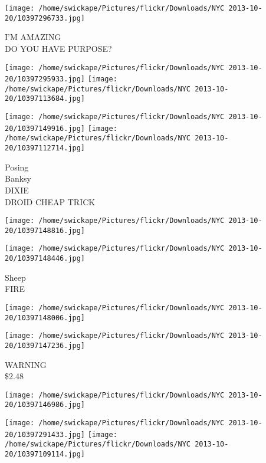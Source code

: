 \documentclass[10pt,letterpaper]{article}
\begin{document}
\vspace{0.25in}
\texttt{[image: /home/swickape/Pictures/flickr/Downloads/NYC 2013-10-20/10397296733.jpg]}

I'M AMAZING\\
DO YOU HAVE PURPOSE?\\
\pagebreak

\texttt{[image: /home/swickape/Pictures/flickr/Downloads/NYC 2013-10-20/10397295933.jpg]}
\texttt{[image: /home/swickape/Pictures/flickr/Downloads/NYC 2013-10-20/10397113684.jpg]}

\texttt{[image: /home/swickape/Pictures/flickr/Downloads/NYC 2013-10-20/10397149916.jpg]}
\texttt{[image: /home/swickape/Pictures/flickr/Downloads/NYC 2013-10-20/10397112714.jpg]}

Posing\\
Banksy\\
DIXIE\\
DROID CHEAP TRICK\\
\pagebreak

\texttt{[image: /home/swickape/Pictures/flickr/Downloads/NYC 2013-10-20/10397148816.jpg]}

\vspace{0.25in}
\texttt{[image: /home/swickape/Pictures/flickr/Downloads/NYC 2013-10-20/10397148446.jpg]}

Sheep\\
FIRE\\
\pagebreak

\texttt{[image: /home/swickape/Pictures/flickr/Downloads/NYC 2013-10-20/10397148006.jpg]}

\vspace{0.25in}
\texttt{[image: /home/swickape/Pictures/flickr/Downloads/NYC 2013-10-20/10397147236.jpg]}

WARNING\\
\$2.48\\
\pagebreak

\texttt{[image: /home/swickape/Pictures/flickr/Downloads/NYC 2013-10-20/10397146986.jpg]}

\vspace{0.25in}
\texttt{[image: /home/swickape/Pictures/flickr/Downloads/NYC 2013-10-20/10397291433.jpg]}
\texttt{[image: /home/swickape/Pictures/flickr/Downloads/NYC 2013-10-20/10397109114.jpg]}
\end{document}
